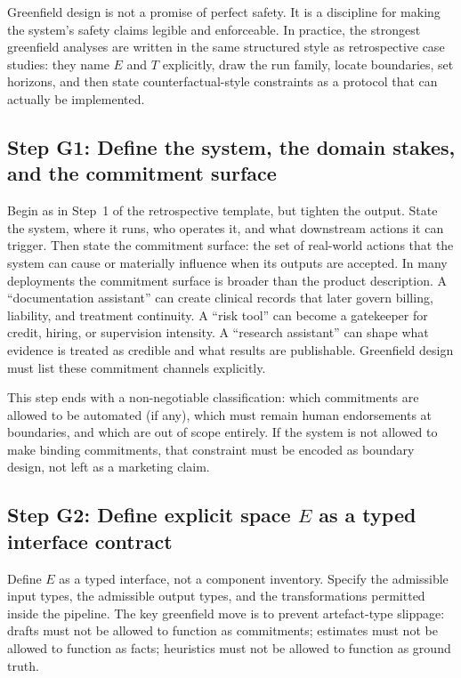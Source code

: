 Greenfield design is not a promise of perfect safety. It is a discipline for making the system’s safety claims legible and enforceable. In practice, the strongest greenfield analyses are written in the same structured style as retrospective case studies: they name \(E\) and \(T\) explicitly, draw the run family, locate boundaries, set horizons, and then state counterfactual-style constraints as a protocol that can actually be implemented.

\subsection{Step G1: Define the system, the domain stakes, and the commitment surface}

Begin as in Step~1 of the retrospective template, but tighten the output. State the system, where it runs, who operates it, and what downstream actions it can trigger. Then state the commitment surface: the set of real-world actions that the system can cause or materially influence when its outputs are accepted. In many deployments the commitment surface is broader than the product description. A ``documentation assistant'' can create clinical records that later govern billing, liability, and treatment continuity. A ``risk tool'' can become a gatekeeper for credit, hiring, or supervision intensity. A ``research assistant'' can shape what evidence is treated as credible and what results are publishable. Greenfield design must list these commitment channels explicitly.

This step ends with a non-negotiable classification: which commitments are allowed to be automated (if any), which must remain human endorsements at boundaries, and which are out of scope entirely. If the system is not allowed to make binding commitments, that constraint must be encoded as boundary design, not left as a marketing claim.

\subsection{Step G2: Define explicit space \(E\) as a typed interface contract}

Define \(E\) as a typed interface, not a component inventory. Specify the admissible input types, the admissible output types, and the transformations permitted inside the pipeline. The key greenfield move is to prevent artefact-type slippage: drafts must not be allowed to function as commitments; estimates must not be allowed to function as facts; heuristics must not be allowed to function as ground truth.

